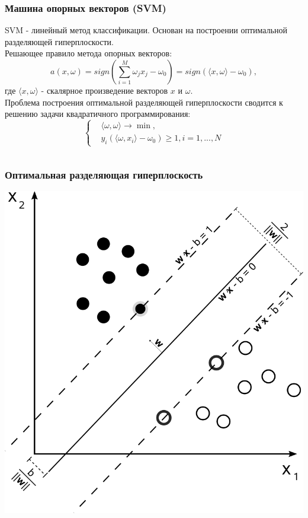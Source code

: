 \documentclass{beamer}
\begin{document}
\begin{frame}
	\frametitle{Машина опорных векторов (SVM)}
	SVM - линейный метод классификации. Основан на построении оптимальной разделяющей гиперплоскости.\\
	Решающее правило метода опорных векторов: $$a(x,\omega)=sign\left(\sum\limits_{i=1}^M\omega_j x_j-\omega_0\right)=sign\left(\langle x,\omega \rangle-\omega_0\right),$$ где $\langle x,\omega \rangle$ - скалярное произведение векторов $x$ и $\omega$.
	\\

	Проблема построения оптимальной разделяющей гиперплоскости сводится к решению задачи квадратичного программирования:
	\begin{equation*}
		\begin{cases}
			&\langle\omega,\omega\rangle\rightarrow\min, \\
			&y_i(\langle\omega,x_i\rangle-\omega_0)\ge1, i=1,...,N
		\end{cases}
	\end{equation*}

	
	$$$$
\end{frame}

\begin{frame}
	\frametitle{Оптимальная разделяющая гиперплоскость}
	\begin{center}
		\includegraphics[width=\linewidth,height=.7\textheight,keepaspectratio]{svm_hyperplane.png}
	\end{center}
\end{frame}
\end{document}
